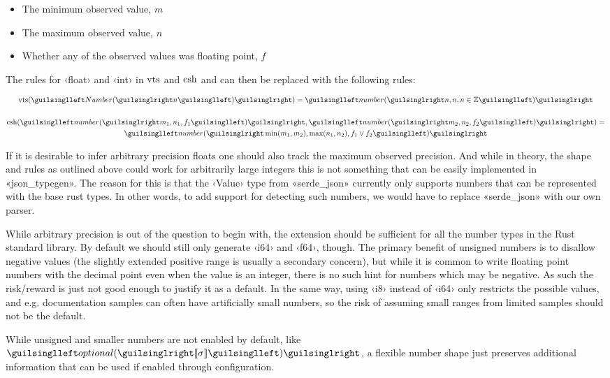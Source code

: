 \begin{itemize}
  \item The minimum observed value, $m$
  \item The maximum observed value, $n$
  \item Whether any of the observed values was floating point, $f$
\end{itemize}

The rules for ‹float› and ‹int› in $\operatorname{vts}$ and $\operatorname{csh}$ and can then be replaced with the following rules:

\begin{gather*}
\shap(‹Number(›n‹)›) = ‹number(› n, n, n \in \mathbb{Z} ‹)› \\
\\
\csh(‹number(› m_1, n_1, f_1 ‹)›, ‹number(› m_2, n_2, f_2 ‹)›) =\\ ‹number(› \min(m_1, m_2), \max(n_1, n_2), f_1 \lor f_2 ‹)›
\end{gather*}

If it is desirable to infer arbitrary precision floats one should also track the maximum observed precision. And while in theory, the shape and rules as outlined above could work for arbitrarily large integers this is not something that can be easily implemented in «json_typegen». The reason for this is that the ‹Value› type from «serde_json» currently only supports numbers that can be represented with the base rust types. In other words, to add support for detecting such numbers, we would have to replace «serde_json» with our own parser.

While arbitrary precision is out of the question to begin with, the extension should be sufficient for all the number types in the Rust standard library. By default we should still only generate ‹i64› and ‹f64›, though. The primary benefit of unsigned numbers is to disallow negative values (the slightly extended positive range is usually a secondary concern), but while it is common to write floating point numbers with the decimal point even when the value is an integer, there is no such hint for numbers which may be negative. As such the risk/reward is just not good enough to justify it as a default. In the same way, using ‹i8› instead of ‹i64› only restricts the possible values, and e.g. documentation samples can often have artificially small numbers, so the risk of assuming small ranges from limited samples should not be the default.

While unsigned and smaller numbers are not enabled by default, like $‹optional(›\vect{\sigma}‹)›$, a flexible number shape just preserves additional information that can be used if enabled through configuration.

